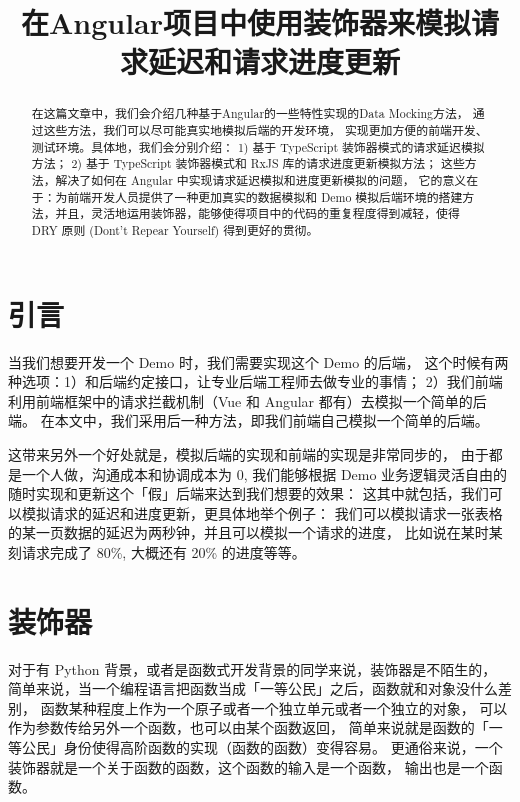 \documentclass{ctexart}
\author{}
\title{在Angular项目中使用装饰器来模拟请求延迟和请求进度更新}
\begin{document}
    \maketitle

    \begin{abstract}
        在这篇文章中，我们会介绍几种基于Angular的一些特性实现的Data Mocking方法，
        通过这些方法，我们可以尽可能真实地模拟后端的开发环境，
        实现更加方便的前端开发、测试环境。具体地，我们会分别介绍：
        1) 基于 TypeScript 装饰器模式的请求延迟模拟方法；
        2) 基于 TypeScript 装饰器模式和 RxJS 库的请求进度更新模拟方法；
        这些方法，解决了如何在 Angular 中实现请求延迟模拟和进度更新模拟的问题，
        它的意义在于：为前端开发人员提供了一种更加真实的数据模拟和 Demo 模拟后端环境的搭建方法，并且，灵活地运用装饰器，能够使得项目中的代码的重复程度得到减轻，使得 DRY 原则 (Dont't Repear Yourself) 得到更好的贯彻。
    \end{abstract}

    \section{引言}

    当我们想要开发一个 Demo 时，我们需要实现这个 Demo 的后端，
    这个时候有两种选项：1）和后端约定接口，让专业后端工程师去做专业的事情；
    2）我们前端利用前端框架中的请求拦截机制（Vue 和 Angular 都有）去模拟一个简单的后端。
    在本文中，我们采用后一种方法，即我们前端自己模拟一个简单的后端。

    这带来另外一个好处就是，模拟后端的实现和前端的实现是非常同步的，
    由于都是一个人做，沟通成本和协调成本为 0,
    我们能够根据 Demo 业务逻辑灵活自由的随时实现和更新这个「假」后端来达到我们想要的效果：
    这其中就包括，我们可以模拟请求的延迟和进度更新，更具体地举个例子：
    我们可以模拟请求一张表格的某一页数据的延迟为两秒钟，并且可以模拟一个请求的进度，
    比如说在某时某刻请求完成了 80\%, 大概还有 20\% 的进度等等。

    \section{装饰器}

    对于有 Python 背景，或者是函数式开发背景的同学来说，装饰器是不陌生的，
    简单来说，当一个编程语言把函数当成「一等公民」之后，函数就和对象没什么差别，
    函数某种程度上作为一个原子或者一个独立单元或者一个独立的对象，
    可以作为参数传给另外一个函数，也可以由某个函数返回，
    简单来说就是函数的「一等公民」身份使得高阶函数的实现（函数的函数）变得容易。
    更通俗来说，一个装饰器就是一个关于函数的函数，这个函数的输入是一个函数，
    输出也是一个函数。
\end{document}
